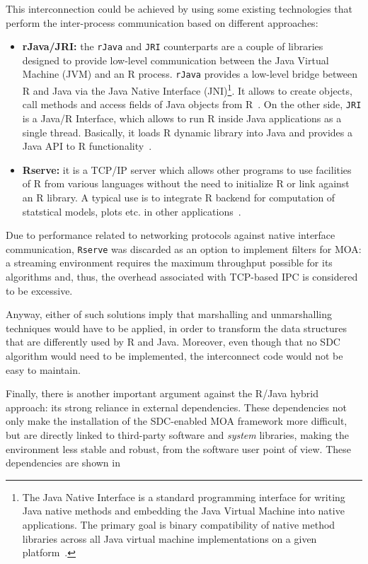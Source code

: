 This interconnection could be achieved by using some existing technologies that perform the inter-process communication based on different approaches:

\begin{itemize}
	\item
	\textbf{rJava/JRI:} the \texttt{rJava} and \texttt{JRI} counterparts are a couple of libraries designed to provide low-level communication between the Java Virtual Machine (JVM) and an R process. \texttt{rJava} provides a low-level bridge between R and Java via the Java Native Interface (JNI)\footnote{The Java Native Interface is a standard programming interface for writing Java native methods and embedding the Java Virtual Machine into native applications. The primary goal is binary compatibility of native method libraries across all Java virtual machine implementations on a given platform~\citep{web:Oracle:JNI}.}. It allows to create objects, call methods and access fields of Java objects from R~\citep{web:rJava}. On the other side, \texttt{JRI} is a Java/R Interface, which allows to run R inside Java applications as a single thread. Basically, it loads R dynamic library into Java and provides a Java API to R functionality~\citep{web:JRI}.
	
	\item
	\textbf{Rserve:} it is a TCP/IP server which allows other programs to use facilities of R from various languages without the need to initialize R or link against an R library. A typical use is to integrate R backend for computation of statstical models, plots etc. in other applications~\citep{web:Rserve}.
\end{itemize}

Due to performance related to networking protocols against native interface communication, \texttt{Rserve} was discarded as an option to implement filters for MOA: a streaming environment requires the maximum throughput possible for its algorithms and, thus, the overhead associated with TCP-based IPC is considered to be excessive.

Anyway, either of such solutions imply that marshalling and unmarshalling techniques would have to be applied, in order to transform the data structures that are differently used by R and Java. Moreover, even though that no SDC algorithm would need to be implemented, the interconnect code would not be easy to maintain.

Finally, there is another important argument against the R/Java hybrid approach: its strong reliance in external dependencies. These dependencies not only make the installation of the SDC-enabled MOA framework more difficult, but are directly linked to third-party software and \textit{system} libraries, making the environment less stable and robust, from the software user point of view. These dependencies are shown in~

